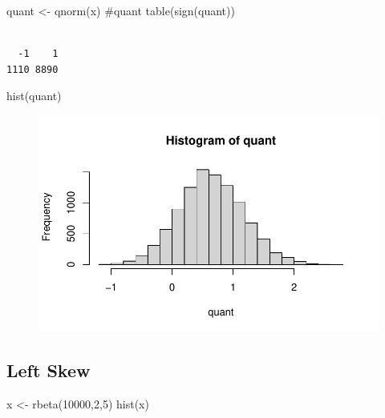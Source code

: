 \documentclass[
  letterpaper,
  DIV=11,
  numbers=noendperiod]{scrreprt}
\newenvironment{Shaded}{\begin{snugshade}}{\end{snugshade}}
\newcommand{\CommentTok}[1]{\textcolor[rgb]{0.37,0.37,0.37}{#1}}
\newcommand{\DecValTok}[1]{\textcolor[rgb]{0.68,0.00,0.00}{#1}}
\newcommand{\FunctionTok}[1]{\textcolor[rgb]{0.28,0.35,0.67}{#1}}
\newcommand{\NormalTok}[1]{\textcolor[rgb]{0.00,0.23,0.31}{#1}}
\newcommand{\OtherTok}[1]{\textcolor[rgb]{0.00,0.23,0.31}{#1}}
\begin{document}
\begin{Shaded}
\begin{Highlighting}[]
\NormalTok{quant }\OtherTok{\textless{}{-}} \FunctionTok{qnorm}\NormalTok{(x)}
\CommentTok{\#quant}
\FunctionTok{table}\NormalTok{(}\FunctionTok{sign}\NormalTok{(quant))}
\end{Highlighting}
\end{Shaded}

\begin{verbatim}

  -1    1 
1110 8890 
\end{verbatim}

\begin{Shaded}
\begin{Highlighting}[]
\FunctionTok{hist}\NormalTok{(quant)}
\end{Highlighting}
\end{Shaded}

\begin{figure}[H]

{\centering \includegraphics{methods_files/figure-pdf/unnamed-chunk-2-3.pdf}

}

\end{figure}

\hypertarget{left-skew}{%
\subsection{Left Skew}\label{left-skew}}

\begin{Shaded}
\begin{Highlighting}[]
\NormalTok{x }\OtherTok{\textless{}{-}} \FunctionTok{rbeta}\NormalTok{(}\DecValTok{10000}\NormalTok{,}\DecValTok{2}\NormalTok{,}\DecValTok{5}\NormalTok{)}
\FunctionTok{hist}\NormalTok{(x)}
\end{Highlighting}
\end{Shaded}
\end{document}
